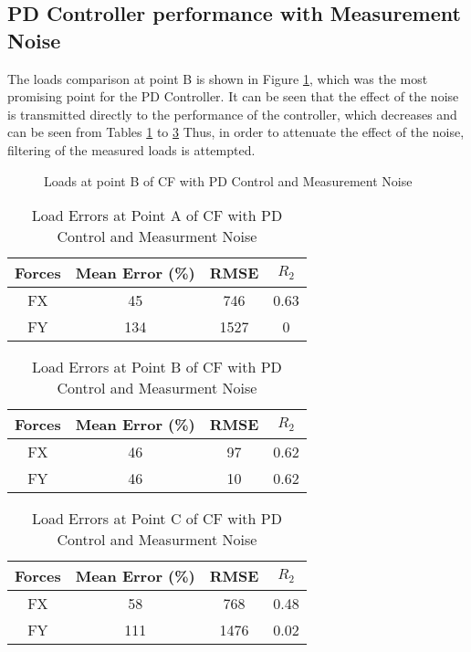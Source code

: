 \subsection*{PD Controller performance with Measurement Noise}

The loads comparison at point B is shown in Figure \ref{fig:BNoise}, which was the most promising point for the PD Controller. It can be seen that the effect of the noise is transmitted directly to the performance of the controller, which decreases and can be seen from Tables \ref{tab:pureFeedbkPDANoise} to \ref{tab:pureFeedbkPDCNoise} Thus, in order to attenuate the effect of the noise, filtering of the measured loads is attempted.

\begin{figure}[h!]
	\centering
	\scalebox{1.0}{
		\begin{tikzpicture}
			
	\end{tikzpicture}}
	\caption{Loads at point B of CF with PD Control and Measurement Noise}
	\label{fig:BNoise}
\end{figure}

\begin{table}[h!]
	\centering
	\begin{tabular}{ |c|c|c|c| } 
		\hline
		Forces & Mean Error (\%) & RMSE & $R_2$\\ 
		\hline
		FX & 45&746&0.63\\ 
		FY & 134&1527&0 \\ 
		\hline
	\end{tabular}
	\caption{Load Errors at Point A of CF with PD Control and Measurment Noise}
	\label{tab:pureFeedbkPDANoise}
\end{table}

\begin{table}[h!]
	\centering
	\begin{tabular}{ |c|c|c|c| } 
		\hline
		Forces & Mean Error (\%) & RMSE & $R_2$\\ 
		\hline
		FX & 46&97&0.62\\ 
		FY & 46&10&0.62 \\ 
		\hline
	\end{tabular}
	\caption{Load Errors at Point B of CF with PD Control and Measurment Noise}
	\label{tab:pureFeedbkPDBNoise}
\end{table}

\begin{table}[h!]
	\centering
	\begin{tabular}{ |c|c|c|c| } 
		\hline
		Forces & Mean Error (\%) & RMSE & $R_2$\\ 
		\hline
		FX & 58&768&0.48\\ 
		FY & 111&1476&0.02 \\ 
		\hline
	\end{tabular}
	\caption{Load Errors at Point C of CF with PD Control and Measurment Noise}
	\label{tab:pureFeedbkPDCNoise}
\end{table}

